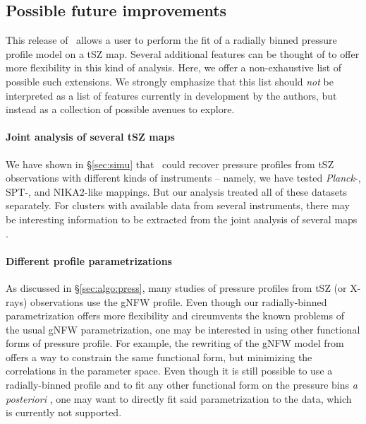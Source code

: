 \subsection{Possible future improvements}

This release of \panco\ allows a user to perform the fit of a radially binned pressure profile model on a tSZ map.
Several additional features can be thought of to offer more flexibility in this kind of analysis.
Here, we offer a non-exhaustive list of possible such extensions.
We strongly emphasize that this list should \textit{not} be interpreted as a list of features currently in development by the authors, but instead as a collection of possible avenues to explore.

\paragraph{Joint analysis of several tSZ maps} %
We have shown in \S\ref{sec:simu} that \panco\ could recover pressure profiles from tSZ observations with different kinds of instruments -- namely, we have tested \textit{Planck}-, SPT-, and NIKA2-like mappings.
But our analysis treated all of these datasets separately.
For clusters with available data from several instruments, there may be interesting information to be extracted from the joint analysis of several maps \citep[see \eg][]{ruppin_first_2018, romero_multi-instrument_2018}.

\paragraph{Different profile parametrizations} %
As discussed in \S\ref{sec:algo:press}, many studies of pressure profiles from tSZ (or X-rays) observations use the gNFW profile.
Even though our radially-binned parametrization offers more flexibility and circumvents the known problems of the usual gNFW parametrization, one may be interested in using other functional forms of pressure profile.
For example, the rewriting of the gNFW model from \citet{battaglia_cluster_2012-1} \citep[see also \eg][]{sayers_evolution_2022} offers a way to constrain the same functional form, but minimizing the correlations in the parameter space.
Even though it is still possible to use a radially-binned profile and to fit any other functional form on the pressure bins \textit{a posteriori} \citep[see \eg][]{munoz-echeverria_multi-probe_2022}, one may want to directly fit said parametrization to the data, which is currently not supported.

